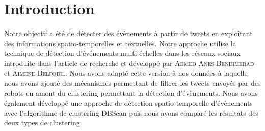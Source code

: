 \documentclass[12pt]{article}
\begin{document}
\begin{abstract}
La d\'etection d'\'ev\`enements est un des sujets de recherche les plus importants dans l'analyse des r\'eseaux sociaux.
Les flux de donn\'ees provenant des plates-formes de ces r\'eseaux contiennent, la plupart du temps, beaucoup d'informations. On peut traiter et analyser ces informations dans le but de faire de la d\'etection d'\'ev\`enement(s). 
\newline
N\'eanmoins, une grande partie des donn\'ees \`a traiter est bruit\'ee, notamment par des comptes Twitter entretenus par des robots. Ces comptes postent des tweets en masse avec une fr\'equence de publication constante, ce qui nous emp\^echent de donner une bonne description d\' un \'ev\'enement ou alors on peut cr\'eer de faux \'ev\`enements. 
\newline
Voila pourquoi il est important de comprendre comment att\'enuer l'influence du bruit pour faire de la d\'etection \'ev\`enements. Notre objectif a \'et\'e de d\'etecter des \'ev\`enements \`a partir de tweets en exploitant des informations spatio-temporelles et textuelles en essayant d'\'ecarter les tweets de robots. 
\end{abstract}

\small{
\tableofcontents 
}


\newpage

\section{Introduction}

\paragraph{}
Notre objectif a \'et\'e de d\'etecter des \'ev\`enements \`a partir de tweets en exploitant des informations spatio-temporelles et textuelles. Notre approche utilise la technique de d\'etection d'\'ev\'enements multi-\'echelles dans les r\'eseaux sociaux introduite dans l'article de recherche \cite{Multievents} et d\'evelopp\'e par \textsc{Ahmed Anes Bendimerad} et \textsc{Aimene Belfodil}. Nous avons adapt\'e cette version \`a nos donn\'ees \`a laquelle nous avons ajout\'e des m\'ecanismes permettant de filtrer les tweets envoy\'es par des robots en amont du clustering permettant la d\'etection d'\'ev\`enements. Nous avons \'egalement d\'evelopp\'e une approche de d\'etection spatio-temporelle d'\'ev\`enements avec l'algorithme de clustering DBScan puis nous avons compar\'e les r\'esultats des deux types de clustering.
\end{document}
